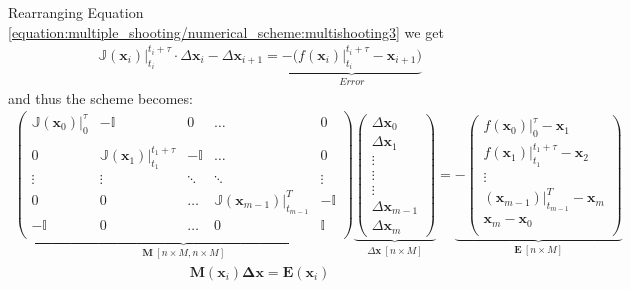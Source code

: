 \documentclass[letterpaper,10pt,english,openany,oneside]{sphinxmanual}
\begin{document}
Re\sphinxhyphen{}arranging Equation \eqref{equation:multiple_shooting/numerical_scheme:multishooting3} we get
\begin{equation}\label{equation:multiple_shooting/numerical_scheme:multishooting4}
\begin{split}      \mathbb{J}(\mathbf{x}_i) \Big \rvert_{t_{i}}^{t_{i}+\tau}\cdot\Delta\mathbf{x}_i -\Delta\mathbf{x}_{i+1} = \underbrace{-\big(f(\mathbf{x}_i)\big \rvert_{t_{i}}^{t_{i}+\tau} - \mathbf{x}_{i+1}\big)}_{Error}\end{split}
\end{equation}
and thus the  scheme becomes:
\begin{equation}\label{equation:multiple_shooting/numerical_scheme:shootingscheme}
\begin{split}\underbrace{
\begin{pmatrix}
\mathbb{J} (\mathbf{x}_0) \Big \rvert_{0}^{\tau}  & - \mathbb{I}& 0& \dots& 0 \\
\\
0 & \mathbb{J} (\mathbf{x}_1)\Big \rvert_{t_{1}}^{t_{1}+\tau}& - \mathbb{I}  & \dots & 0\\
\vdots & \vdots & \ddots & \ddots & \vdots \\
0 & 0 &\dots & \mathbb{J}(\mathbf{x}_{m-1})\Big \rvert_{t_{m-1}}^{T}  & - \mathbb{I}\\
- \mathbb{I} & 0 &\dots & 0 &  \mathbb{I}\\
\end{pmatrix}}_{\mathbf{M}\ [n \times M, n \times M]}
\underbrace{
\begin{pmatrix}
\Delta \mathbf{x}_{0}\\
\Delta \mathbf{x}_{1}\\
\vdots\\
\vdots\\
\vdots\\
\Delta \mathbf{x}_{m-1}\\
\Delta \mathbf{x}_{m}
\end{pmatrix}}_{\Delta\mathbf{x}\ [n \times M]}=
\underbrace{-\begin{pmatrix}
f(\mathbf{x}_0) \big \rvert_{0}^{\tau}- \mathbf{x}_1 \\
f(\mathbf{x}_1) \big \rvert_{t_{1}}^{t_{1}+\tau}- \mathbf{x}_2 \\
\vdots\\
(\mathbf{x}_{m-1}) \big \rvert_{t_{m-1}}^{T} - \mathbf{x}_m\\
\mathbf{x}_{m}- \mathbf{x}_0\\
\end{pmatrix}}_{\mathbf{E}\ [n \times M]}\end{split}
\end{equation}\begin{equation}\label{equation:multiple_shooting/numerical_scheme:multishootingcompact}
\begin{split}\mathbf{M}(\mathbf{x}_i) \mathbf{\Delta \mathbf{x}} = \mathbf{E}(\mathbf{x}_i)\end{split}
\end{equation}
\end{document}
